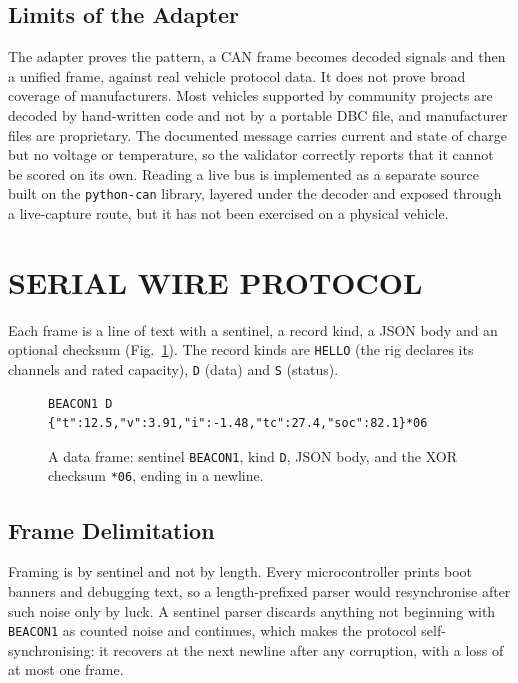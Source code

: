 \documentclass[12pt,a4paper]{amritareport}
\begin{document}
\subsection{Limits of the Adapter}

The adapter proves the pattern, a CAN frame becomes decoded signals and then a unified frame, against real vehicle protocol data. It does not prove broad coverage of manufacturers. Most vehicles supported by community projects are decoded by hand-written code and not by a portable DBC file, and manufacturer files are proprietary. The documented message carries current and state of charge but no voltage or temperature, so the validator correctly reports that it cannot be scored on its own. Reading a live bus is implemented as a separate source built on the \texttt{python-can} library, layered under the decoder and exposed through a live-capture route, but it has not been exercised on a physical vehicle.

\section{SERIAL WIRE PROTOCOL}
\label{sec:impl-protocol}

Each frame is a line of text with a sentinel, a record kind, a JSON body and an optional checksum (Fig.~\ref{fig:frame}). The record kinds are \texttt{HELLO} (the rig declares its channels and rated capacity), \texttt{D} (data) and \texttt{S} (status).

\begin{figure}[htbp]
    \centering
    {\footnotesize
\begin{verbatim}
BEACON1 D {"t":12.5,"v":3.91,"i":-1.48,"tc":27.4,"soc":82.1}*06
\end{verbatim}}
    \caption{A data frame: sentinel \texttt{BEACON1}, kind \texttt{D}, JSON body, and the XOR checksum \texttt{*06}, ending in a newline.}
    \label{fig:frame}
\end{figure}

\subsection{Frame Delimitation}

Framing is by sentinel and not by length. Every microcontroller prints boot banners and debugging text, so a length-prefixed parser would resynchronise after such noise only by luck. A sentinel parser discards anything not beginning with \texttt{BEACON1} as counted noise and continues, which makes the protocol self-synchronising: it recovers at the next newline after any corruption, with a loss of at most one frame.
\end{document}

